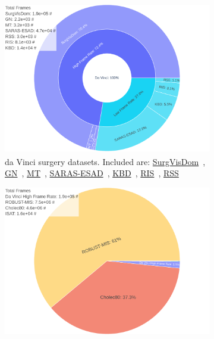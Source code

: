 \begin{figure}[tb]
\centering
\begin{subfigure}[b]{0.49\textwidth}
    \centering
    \includegraphics[width=\textwidth]{fig/fig_da_vinci.pdf}
    \caption{da Vinci\textsuperscript{\textregistered} surgery datasets. Included are: \href{https://surgvisdom.grand-challenge.org/}{SurgVisDom}~\cite{zia2021surgical}, \href{http://hamlyn.doc.ic.ac.uk/vision/}{GN}~\cite{giannarou2012probabilistic}, \href{http://hamlyn.doc.ic.ac.uk/vision/}{MT}~\cite{mountney2010three}, \href{https://saras-esad.grand-challenge.org/}{SARAS-ESAD}~\cite{bawa2020esad}, \href{https://endovissub2017-kidneyboundarydetection.grand-challenge.org/}{KBD}~\cite{hattab2020kidney}, \href{https://endovissub2017-roboticinstrumentsegmentation.grand-challenge.org/}{RIS}~\cite{allan20192017}, \href{https://endovissub2018-roboticscenesegmentation.grand-challenge.org/home/}{RSS}~\cite{allan20202018}}
    \label{c3:fig:data_a}
\end{subfigure}
\begin{subfigure}[b]{0.49\textwidth}
    \centering
    \includegraphics[width=\textwidth]{fig/fig_da_vinci_high_fps_laparoscopic.pdf}

\end{subfigure}
\end{figure}
